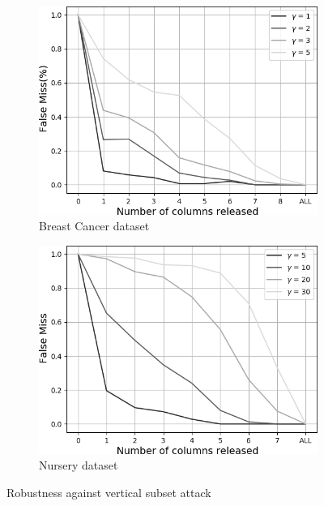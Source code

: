 \documentclass[runningheads]{llncs}
\begin{document}
\begin{figure}[th]
    \centering
    \begin{subfigure}{.42\textwidth}
        \includegraphics[width=1\linewidth]{figures/vertical_subset_bc_grey.png}
        \caption{Breast Cancer dataset}
        \label{fig:vertical-subset-bc}
    \end{subfigure}
    \hspace{0.02\textwidth}
    \begin{subfigure}{.42\textwidth}
        \includegraphics[width=1\linewidth]{figures/vertical_subset_n_grey.png}
        \caption{Nursery dataset}
        \label{fig:vertical-subset-n}
    \end{subfigure}
    \caption{Robustness against vertical subset attack}
    \label{fig:vertical-subset}
\end{figure}
\end{document}
